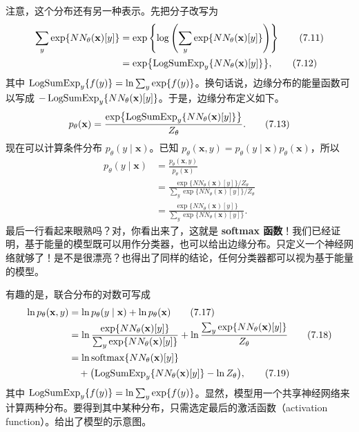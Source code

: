 注意，这个分布还有另一种表示。先把分子改写为
\begin{align}
\sum_y\exp\{NN_\theta(\mathbf{x})[y]\}
 &=\exp\left\{\log\left(\sum_y\exp\{NN_\theta(\mathbf{x})[y]\}\right)\right\}
       \tag{7.11}\label{eq:07-11}\\
 &=\exp\bigl\{\operatorname{LogSumExp}_y\{NN_\theta(\mathbf{x})[y]\}\bigr\},
       \tag{7.12}\label{eq:07-12}
\end{align}
其中 $\operatorname{LogSumExp}_y\{f(y)\}=\ln\sum_y\exp\{f(y)\}$。换句话说，边缘分布的能量函数可以写成 $-\operatorname{LogSumExp}_y\{NN_\theta(\mathbf{x})[y]\}$。于是，边缘分布定义如下。
\begin{equation}
p_\theta(\mathbf{x})
 =\frac{\exp\bigl\{\operatorname{LogSumExp}_y\{NN_\theta(\mathbf{x})[y]\}\bigr\}}{Z_\theta}.
\tag{7.13}\label{eq:07-13}
\end{equation}
现在可以计算条件分布 $p_\theta(y\mid\mathbf{x})$。已知 $p_\theta(\mathbf{x},y)=p_\theta(y\mid\mathbf{x})p_\theta(\mathbf{x})$，所以
\begin{align}
p_\theta(y\mid\mathbf{x})&=\frac{p_\theta(\mathbf{x},y)}{p_\theta(\mathbf{x})}
                        \tag{7.14}\label{eq:07-14}\\
 &=\frac{\exp\{NN_\theta(\mathbf{x})[y]\}/Z_\theta}
         {\sum_y\exp\{NN_\theta(\mathbf{x})[y]\}/Z_\theta}
                        \tag{7.15}\label{eq:07-15}\\
 &=\frac{\exp\{NN_\theta(\mathbf{x})[y]\}}{\sum_y\exp\{NN_\theta(\mathbf{x})[y]\}}.
                        \tag{7.16}\label{eq:07-16}
\end{align}
最后一行看起来眼熟吗？对，你看出来了，这就是 \textbf{softmax 函数}！我们已经证明，基于能量的模型既可以用作分类器，也可以给出边缘分布。只定义一个神经网络就够了！是不是很漂亮？也得出了同样的结论，任何分类器都可以视为基于能量的模型。

有趣的是，联合分布的对数可写成
\begin{align}
\ln p_\theta(\mathbf{x},y)&=\ln p_\theta(y\mid\mathbf{x})+\ln p_\theta(\mathbf{x})
                         \tag{7.17}\label{eq:07-17}\\
 &=\ln\frac{\exp\{NN_\theta(\mathbf{x})[y]\}}{\sum_y\exp\{NN_\theta(\mathbf{x})[y]\}}
   +\ln\frac{\sum_y\exp\{NN_\theta(\mathbf{x})[y]\}}{Z_\theta}
                         \tag{7.18}\label{eq:07-18}\\
 &=\ln\operatorname{softmax}\{NN_\theta(\mathbf{x})[y]\}\notag\\
 &\quad+\bigl(\operatorname{LogSumExp}_y\{NN_\theta(\mathbf{x})[y]\}-\ln Z_\theta\bigr),
                         \tag{7.19}\label{eq:07-19}
\end{align}
其中 $\operatorname{LogSumExp}_y\{f(y)\}=\ln\sum_y\exp\{f(y)\}$。显然，模型用一个共享神经网络来计算两种分布。要得到其中某种分布，只需选定最后的激活函数（activation function）。给出了模型的示意图。

